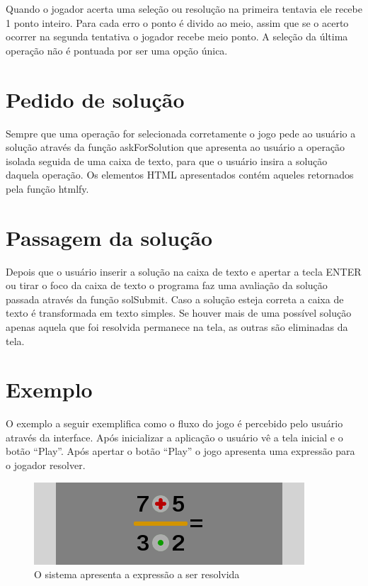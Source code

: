 Quando o jogador acerta uma seleção ou resolução na primeira tentavia ele recebe 1 ponto inteiro. Para cada erro o ponto é divido ao meio, assim que se o acerto ocorrer na segunda tentativa o jogador recebe meio ponto. A seleção da última operação não é pontuada por ser uma opção única.

\section{Pedido de solução}
Sempre que uma operação for selecionada corretamente o jogo pede ao usuário a solução através da função askForSolution que apresenta ao usuário a operação isolada seguida de uma caixa de texto, para que o usuário insira a solução daquela operação. Os elementos HTML apresentados contém aqueles retornados pela função htmlfy.

\section{Passagem da solução}
Depois que o usuário inserir a solução na caixa de texto e apertar a tecla ENTER ou tirar o foco da caixa de texto o programa faz uma avaliação da solução passada através da função solSubmit. Caso a solução esteja correta a caixa de texto é transformada em texto simples. Se houver mais de uma possível solução apenas aquela que foi resolvida permanece na tela, as outras são eliminadas da tela.

\section{Exemplo}
O exemplo a seguir exemplifica como o fluxo do jogo é percebido pelo usuário através da interface. Após inicializar a aplicação o usuário vê a tela inicial e o botão “Play”. Após apertar o botão “Play” o jogo apresenta uma expressão para o jogador resolver.

\begin{figure}[H]
	\caption{\label{xp_1} O sistema apresenta a expressão a ser resolvida}
	\begin{center}
	    \includegraphics[scale=1]{xp_4_1.png}
	\end{center}
\end{figure}

